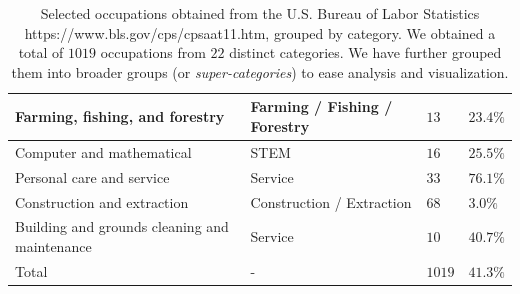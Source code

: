 \documentclass[twoside,11pt]{article}
\begin{document}
\begin{table}[H]
\begin{small}
\begin{tabular}{|m{3.5cm}|m{2.0cm}|m{2.5cm}|m{2.5cm}|}
	Farming, fishing, and forestry 					& Farming / Fishing / Forestry 	& $13$ 				& $23.4\%$				\\ \hline
	Computer and mathematical						& STEM 							& $16$ 				& $25.5\%$				\\ \hline
	Personal care and service						& Service 						& $33$ 				& $76.1\%$				\\ \hline
	Construction and extraction 					& Construction / Extraction 	& $68$ 				& $3.0\%$ 				\\ \hline
	Building and grounds cleaning and maintenance 	& Service 						& $10$ 				& $40.7\%$				\\ \hline \hline
	Total											& - 							& $1019$			& $41.3\%$				\\ \hline
	\end{tabular}
    \end{small}
	\caption{Selected occupations obtained from the U.S. Bureau of Labor Statistics https://www.bls.gov/cps/cpsaat11.htm, grouped by category. We obtained a total of $1019$ occupations from $22$ distinct categories. We have further grouped them into broader groups (or \emph{super-categories}) to ease analysis and visualization.}
	\label{tab:occupations}
\end{table}
\end{document}
